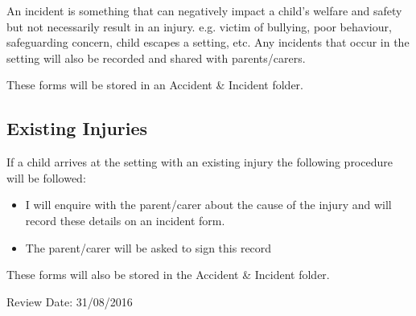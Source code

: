 An incident is something that can negatively impact a child's welfare and
safety but not necessarily result in an injury. e.g. victim of bullying, 
poor behaviour, safeguarding concern, child escapes a setting, etc.
Any incidents that occur in the setting will also be recorded and shared with
parents/carers.

These forms will be stored in an Accident \& Incident folder.

\subsection{Existing Injuries}

If a child arrives at the setting with an existing injury the following
procedure will be followed:

\begin{itemize}
\item
  I will enquire with the parent/carer about the cause of the injury
  and will record these details on an incident form.~
\item
  The parent/carer will be asked to sign this record~
\end{itemize}

These forms will also be stored in the Accident \& Incident folder.

Review Date: 31/08/2016


